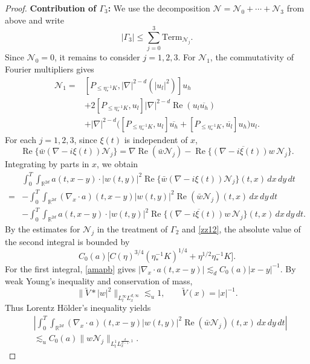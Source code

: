 \documentclass[reqno,11pt]{amsart}
\theoremstyle{plain}
\theoremstyle{definition}
\numberwithin{equation}{section}
\numberwithin{theorem}{section}
\def\leq{\leqslant}
\def\R{\mathbb{R}}
\begin{document}
\begin{proof}
\vskip 0.1in

\textbf{Contribution of $\Gamma_3$:}
We use the decomposition $\mathcal N=\mathcal N_0+\cdots+\mathcal N_3$
from above and write
\[
 |\Gamma_3|\leq\sum_{j=0}^3\mathrm{Term}_{\mathcal N_j}.
\]
Since $\mathcal N_0=0$, it remains to consider $j=1,2,3$. For $\mathcal N_1$,
the commutativity of Fourier multipliers gives
\begin{align*}
 \mathcal N_1={}&
 [P_{\leq\eta_{\ast}^{-1}K},|\nabla|^{2-d}(|u_l|^2)]u_h\\
 &+2[P_{\leq\eta_{\ast}^{-1}K},u_l]
              |\nabla|^{2-d}\operatorname{Re}(u_l\overline{u_h})\\
 &+|\nabla|^{2-d}\big(
       [P_{\leq\eta_{\ast}^{-1}K},u_l]\overline{u_h}
       +[P_{\leq\eta_{\ast}^{-1}K},\overline{u_l}]u_h\big)u_l.
\end{align*}
For each $j=1,2,3$, since $\xi(t)$ is independent of $x$,
\[
 \operatorname{Re}\{\bar w(\nabla-i\xi(t))\mathcal N_j\}
 =\nabla\operatorname{Re}(\bar w\mathcal N_j)
 -\operatorname{Re}\{\overline{(\nabla-i\xi(t))w}\,\mathcal N_j\}.
\]
Integrating by parts in $x$, we obtain
\begin{align*}
 &\int_0^T\int_{\R^{2d}}a(t,x-y)\cdot|w(t,y)|^2
       \operatorname{Re}\{\bar w(\nabla-i\xi(t))\mathcal N_j\}(t,x)
                                  \,dx\,dy\,dt\\
 ={}&-\int_0^T\int_{\R^{2d}}(\nabla_x\cdot a)(t,x-y)|w(t,y)|^2
       \operatorname{Re}(\bar w\mathcal N_j)(t,x)\,dx\,dy\,dt\\
 &-\int_0^T\int_{\R^{2d}}a(t,x-y)\cdot|w(t,y)|^2
       \operatorname{Re}\{\overline{(\nabla-i\xi(t))w}\,\mathcal N_j\}(t,x)
                                  \,dx\,dy\,dt.
\end{align*}
By the estimates for $\mathcal N_j$ in the treatment of $\Gamma_2$ and
\eqref{zz12}, the absolute value of the second integral is bounded by
\[
 C_0(a)\big[C(\eta)^{3/4}(\eta_{\ast}^{-1}K)^{1/4}
                    +\eta^{1/2}\eta_{\ast}^{-1}K\big].
\]
For the first integral, \eqref{amapb} gives
$|\nabla_x\cdot a(t,x-y)|\lesssim_d C_0(a)|x-y|^{-1}$.
By weak Young's inequality and conservation of mass,
\[
 \|\tilde V*|w|^2\|_{L_t^\infty L_x^{d,\infty}}\lesssim_u1,
 \qquad \tilde V(x)=|x|^{-1}.
\]
Thus Lorentz H\"older's inequality yields
\begin{align*}
 &\left|\int_0^T\int_{\R^{2d}}(\nabla_x\cdot a)(t,x-y)|w(t,y)|^2
       \operatorname{Re}(\bar w\mathcal N_j)(t,x)\,dx\,dy\,dt\right|\\
 &\lesssim_u C_0(a)\|w\mathcal N_j\|_{L_t^1L_x^{\frac d{d-1},1}}.
\end{align*}


\end{proof}
\end{document}
